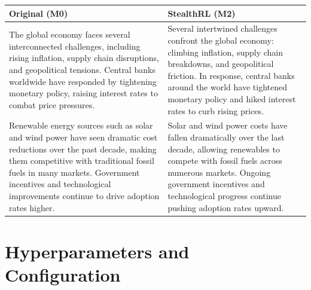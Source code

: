 \documentclass[11pt]{article}
\begin{document}
\begin{center}
\footnotesize
\setlength{\tabcolsep}{4pt}
\begin{tabularx}{\columnwidth}{>{\raggedright\arraybackslash}X >{\raggedright\arraybackslash}X}
\toprule
\textbf{Original (M0)} & \textbf{StealthRL (M2)} \\
\midrule
The global economy faces several interconnected challenges, including rising inflation, supply chain disruptions, and geopolitical tensions. Central banks worldwide have responded by tightening monetary policy, raising interest rates to combat price pressures. &
Several intertwined challenges confront the global economy: climbing inflation, supply chain breakdowns, and geopolitical friction. In response, central banks around the world have tightened monetary policy and hiked interest rates to curb rising prices. \\
\midrule
Renewable energy sources such as solar and wind power have seen dramatic cost reductions over the past decade, making them competitive with traditional fossil fuels in many markets. Government incentives and technological improvements continue to drive adoption rates higher. &
Solar and wind power costs have fallen dramatically over the last decade, allowing renewables to compete with fossil fuels across numerous markets. Ongoing government incentives and technological progress continue pushing adoption rates upward. \\
\bottomrule
\end{tabularx}
\label{tab:qual3}
\end{center}

\FloatBarrier
\newpage
\section{Hyperparameters and Configuration}
\label{sec:hyperparams}
\end{document}
